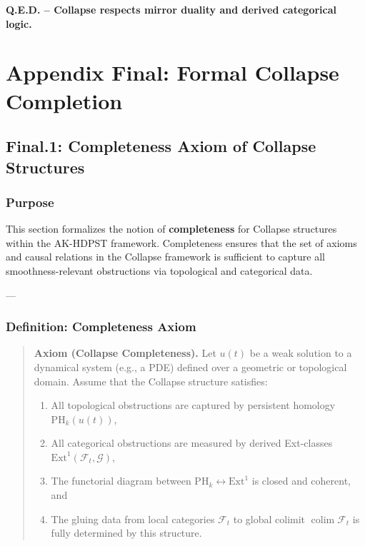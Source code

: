 \documentclass[11pt]{article}
\DeclareMathOperator{\colim}{colim}
\begin{document}
\begin{axiom}
\begin{axiom}
{{\begin{center}
\textbf{Q.E.D. – Collapse respects mirror duality and derived categorical logic.}
\end{center}





\section*{Appendix Final: Formal Collapse Completion}

\subsection*{Final.1: Completeness Axiom of Collapse Structures}

\subsubsection*{Purpose}

This section formalizes the notion of \textbf{completeness} for Collapse structures within the AK-HDPST framework.  
Completeness ensures that the set of axioms and causal relations in the Collapse framework is sufficient  
to capture all smoothness-relevant obstructions via topological and categorical data.

---

\subsubsection*{Definition: Completeness Axiom}

\begin{quote}
\textbf{Axiom (Collapse Completeness).}  
Let \( u(t) \) be a weak solution to a dynamical system (e.g., a PDE) defined over a geometric or topological domain.  
Assume that the Collapse structure satisfies:

\begin{enumerate}
  \item All topological obstructions are captured by persistent homology \(\mathrm{PH}_k(u(t))\),
  \item All categorical obstructions are measured by derived Ext-classes \(\mathrm{Ext}^1(\mathcal{F}_t, \mathcal{G})\),
  \item The functorial diagram between \(\mathrm{PH}_k \leftrightarrow \mathrm{Ext}^1\) is closed and coherent, and
  \item The gluing data from local categories \(\mathcal{F}_t\) to global colimit \(\colim \mathcal{F}_t\) is fully determined by this structure.
\end{enumerate}


\end{quote}}}
\end{axiom}
\end{axiom}
\end{document}
